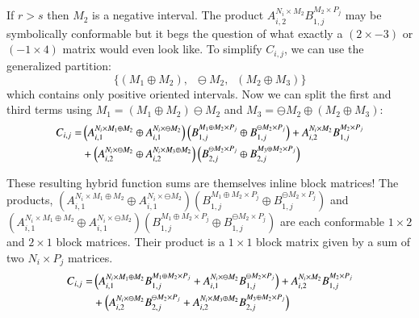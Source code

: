 If $r > s$ then $M_2$ is a negative interval.
The product $A_{i,2}^{N_i \times M_2} B_{1,j}^{M_2 \times P_j}$ may be symbolically conformable but it begs the 
question of what exactly a $(2 \times -3)$ or $(-1 \times 4)$ matrix would even look like.
To simplify $C_{i,j}$, we can use the generalized partition:
\begin{equation*}
 	\Big\{ \left(M_1 \oplus M_2\right), \;\; \ominus M_2, \;\; \left(M_2 \oplus M_3\right) \Big\}
\end{equation*}
which contains only positive oriented intervals.
Now we can split the first and third terms using $M_1 = (M_1 \oplus M_2) \ominus M_2$ 
and $M_3 = \ominus M_2 \oplus (M_2 \oplus M_3)$:
\begin{align*}
	C_{i,j} 	= &\left( A_{i,1}^{N_i \times M_1 \oplus M_2} \oplus A_{i,1}^{N_i \times \ominus M_2} \right)
				\left( B_{1,j}^{M_1 \oplus M_2 \times P_j} \oplus B_{1,j}^{\ominus M_2 \times P_j} \right)
			+ A_{i,2}^{N_i \times M_2} B_{1,j}^{M_2 \times P_j} \notag\\
			&+ \left( A_{i,2}^{N_i \times \ominus M_2} \oplus A_{i,2}^{N_i \times M_3 \oplus M_2} \right)
			 \left( B_{2,j}^{\ominus M_2 \times P_j} \oplus B_{2,j}^{M_3 \oplus M_2 \times P_j} \right)
\end{align*}

These resulting hybrid function sums are themselves inline block matrices!
The products, $\left( A_{i,1}^{N_i \times M_1 \oplus M_2} \oplus A_{i,1}^{N_i \times \ominus M_2} \right)
	  \left( B_{1,j}^{M_1 \oplus M_2 \times P_j} \oplus B_{1,j}^{\ominus M_2 \times P_j} \right)$
and $\left( A_{i,1}^{N_i \times M_1 \oplus M_2} \oplus A_{i,1}^{N_i \times \ominus M_2} \right)
	  \left( B_{1,j}^{M_1 \oplus M_2 \times P_j} \oplus B_{1,j}^{\ominus M_2 \times P_j} \right)$	 
are each conformable $1 \times 2$ and $2 \times 1$ block matrices.
Their product is a $1 \times 1$ block matrix given by a sum of two $N_i \times P_j$ matrices.
\begin{align*}
	C_{i,j} 	= & \left( A_{i,1}^{N_i \times M_1 \oplus M_2} B_{1,j}^{M_1 \oplus M_2 \times P_j}
			+ A_{i,1}^{N_i \times \ominus M_2} B_{1,j}^{\ominus M_2 \times P_j} \right)
			+ A_{i,2}^{N_i \times M_2} B_{1,j}^{M_2 \times P_j} \notag\\
			&+ \left( A_{i,2}^{N_i \times \ominus M_2} B_{2,j}^{\ominus M_2 \times P_j}
			+ A_{i,2}^{N_i \times M_3 \oplus M_2} B_{2,j}^{M_3 \oplus M_2 \times P_j} \right)
\end{align*}


